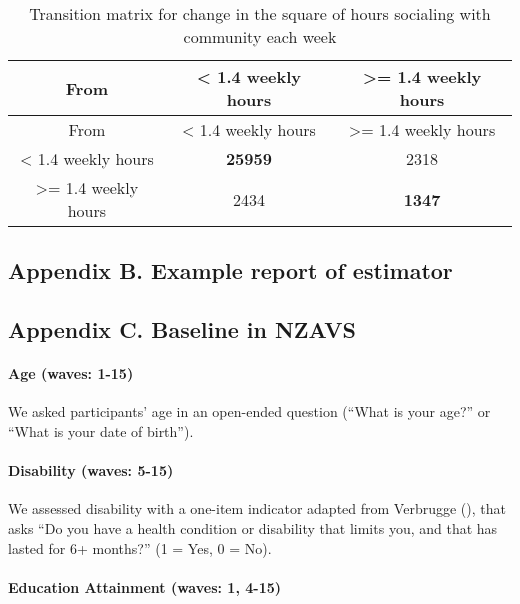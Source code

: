 \documentclass[
  singlecolumn]{article}
\let\oldparagraph\paragraph
\renewcommand{\paragraph}[1]{\oldparagraph{#1}\mbox{}}
\begin{document}
\begin{longtable}[]{@{}ccc@{}}
\caption{Transition matrix for change in the square of hours socialing
with community each
week}\label{tbl-transition-socialising-shift}\tabularnewline
\toprule\noalign{}
From & \textless{} 1.4 weekly hours & \textgreater= 1.4 weekly hours \\
\midrule\noalign{}
\endfirsthead
\toprule\noalign{}
From & \textless{} 1.4 weekly hours & \textgreater= 1.4 weekly hours \\
\midrule\noalign{}
\endhead
\bottomrule\noalign{}
\endlastfoot
\textless{} 1.4 weekly hours & \textbf{25959} & 2318 \\
\textgreater= 1.4 weekly hours & 2434 & \textbf{1347} \\
\end{longtable}

\subsection{Appendix B. Example report of
estimator}\label{appendix-b.-example-report-of-estimator}

\subsection{Appendix C. Baseline in
NZAVS}\label{appendix-c.-baseline-in-nzavs}

\paragraph{Age (waves: 1-15)}\label{age-waves-1-15}

We asked participants' age in an open-ended question (``What is your
age?'' or ``What is your date of birth'').

\paragraph{Disability (waves: 5-15)}\label{disability-waves-5-15}

We assessed disability with a one-item indicator adapted from Verbrugge
(), that asks ``Do you have a health
condition or disability that limits you, and that has lasted for 6+
months?'' (1 = Yes, 0 = No).

\paragraph{Education Attainment (waves: 1,
4-15)}\label{education-attainment-waves-1-4-15}
\end{document}
